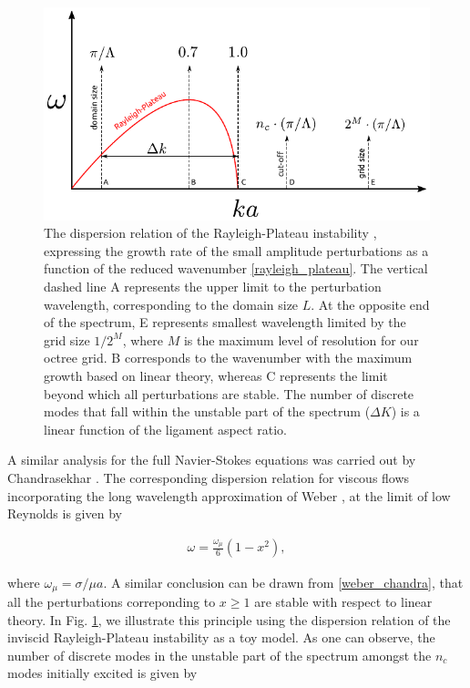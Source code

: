 \begin{figure}
\centering
\includegraphics{plots/ligament_breakup/wave_quant.pdf}
\caption{ The dispersion relation of the Rayleigh-Plateau instability 
	\cite{rayleigh1879a, plateau1849}, expressing the growth rate of 
	the small amplitude perturbations as a function of 
	the reduced wavenumber \eqref{rayleigh_plateau}.
	The vertical dashed line A represents the upper limit
	to the perturbation wavelength, corresponding to the domain size $L$. 
	At the opposite end of the spectrum, E represents smallest wavelength  
        limited by the grid size $1/2^M$, where $M$ is the maximum level of 
	resolution for our octree grid. B corresponds to the wavenumber with 
	the maximum growth based on linear theory, whereas C represents the limit
	beyond which all perturbations are stable. The number of discrete modes
	that fall within the unstable part of the spectrum ($\Delta K$) 
	is a linear function of the ligament aspect ratio. 
	}
\label{quant}
\end{figure}

A similar analysis for the full Navier-Stokes equations 
was carried out by Chandrasekhar \cite{chandra}. 
The corresponding dispersion relation for viscous 
flows incorporating the long wavelength approximation 
of Weber \cite{weber1931}, at the limit of low Reynolds is given by

\begin{align}
\omega = \frac{\omega_\mu}{6}\left(1 - x^2 \right) , 
\label{weber_chandra}
\end{align}

where $\omega_\mu = \sigma / \mu a $. 
A similar conclusion can be drawn from \eqref{weber_chandra},
that all the perturbations correponding to $x \geq 1 $ are 
stable with respect to linear theory. 
\marginnote{
}
In Fig. \ref{quant}, we illustrate this principle using the dispersion 
relation of the inviscid Rayleigh-Plateau instability as a toy model. 
As one can observe, the number of discrete modes in the unstable part
of the spectrum amongst the $n_c$ modes initially excited is given by 

